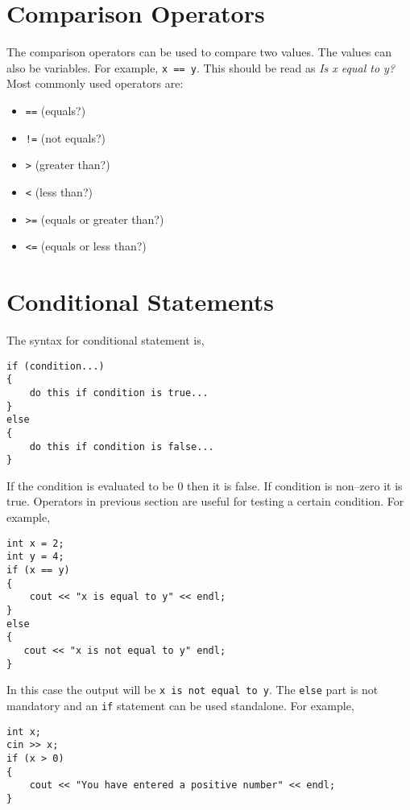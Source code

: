 \documentclass[12pt,a4paper]{article}
\begin{document}
\section{Comparison Operators}
The comparison operators can be used to compare two values. The values can also be variables.  For example, \verb|x == y|. This should be read as \textit{Is x equal to y?} Most commonly used operators are:
\begin{itemize}
\item \verb|==| (equals?)
\item \verb|!=| (not equals?)
\item \verb|>| (greater than?)
\item \verb|<| (less than?)
\item \verb|>=| (equals or greater than?)
\item \verb|<=| (equals or less than?)
\end{itemize}

\section{Conditional Statements}
The syntax for conditional statement is,
\begin{lstlisting}
if (condition...)
{
    do this if condition is true...
}
else
{
    do this if condition is false...
}
\end{lstlisting}
If the condition is evaluated to be 0 then it is false. If condition is non--zero it is true.
Operators in previous section are useful for testing a certain condition. For example,
\begin{lstlisting}
int x = 2;
int y = 4;
if (x == y)
{
    cout << "x is equal to y" << endl;
}
else
{
   cout << "x is not equal to y" endl;
}
\end{lstlisting}
In this case the output will be \verb|x is not equal to y|. The \verb|else| part is not mandatory and an \verb|if| statement can be used standalone. For example,
\begin{lstlisting}
int x;
cin >> x;
if (x > 0)
{
    cout << "You have entered a positive number" << endl;
}
\end{lstlisting}
\end{document}
